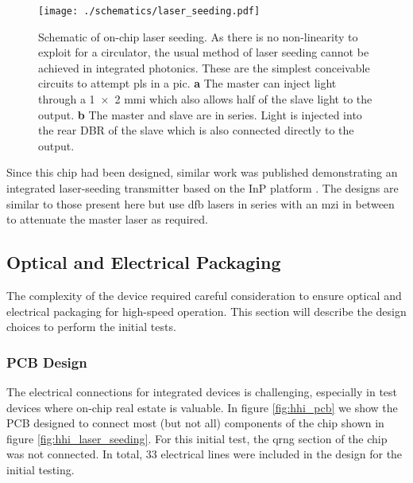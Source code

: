 

\begin{figure}[t]
	\centering
	\texttt{[image: ./schematics/laser\_seeding.pdf]}
	\caption[Schematic of on-chip laser seeding]{Schematic of on-chip laser seeding. As there is no non-linearity to exploit for a circulator, the usual method of laser seeding cannot be achieved in integrated photonics. These are the simplest conceivable circuits to attempt \ac{pls} in a \ac{pic}. \textbf{a} The master can inject light through a \num{1x2} \ac{mmi} which also allows half of the slave light to the output. \textbf{b} The master and slave are in series. Light is injected into the rear \ac{DBR} of the slave which is also connected directly to the output.}
	\label{fig:las_seed_schem}
\end{figure}

Since this chip had been designed, similar work was published demonstrating an integrated laser-seeding transmitter based on the \ac{InP} platform \cite{paraiso2019}. The designs are similar to those present here but use \ac{dfb} lasers in series with an \ac{mzi} in between to attenuate the master laser as required. 

\subsection{Optical and Electrical Packaging}

The complexity of the device required careful consideration to ensure optical and electrical packaging for high-speed operation. This section will describe the design choices to perform the initial tests.

\subsubsection*{PCB Design}

The electrical connections for integrated devices is challenging, especially in test devices where on-chip real estate is valuable. In figure \ref{fig:hhi_pcb} we show the PCB designed to connect most (but not all) components of the chip shown in figure \ref{fig:hhi_laser_seeding}. For this initial test, the \ac{qrng} section of the chip was not connected. In total, 33 electrical lines were included in the design for the initial testing.

